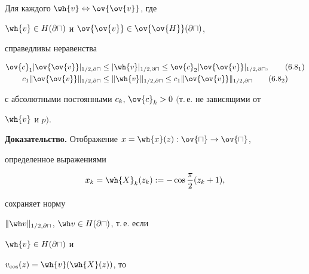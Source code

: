 \begin{lems}\label{lem6.1}


Для каждого $\wh{v}\Leftrightarrow \ov{\ov{v}}$, где 


$\wh{v}\in H(\partial\sqcap)$ и $\ov{\ov{v}}\in 


\ov{\ov{H}}(\partial\sqcap)$, 


справедливы неравенства 


\begin{gather}




\ov{c}_1|\ov{\ov{v}}|_{1/2,\partial\sqcap} \leq


|\wh{v}|_{1/2,\partial\sqcap} \leq


\ov{c}_2|\ov{\ov{v}}|_{1/2,\partial\sqcap},\tag{6.8$_1$} \\


%


c_1\|\ov{\ov{v}}\|_{1/2,\partial\sqcap} \leq


\|\wh{v}\|_{1/2,\partial\sqcap} \leq


c_1\|\ov{\ov{v}}\|_{1/2,\partial\sqcap}\tag{6.8$_2$}


\end{gather}


с абсолютными постоянными $c_k,\,\ov{c}_k > 0$ $($т.\,е. не зависящими от




$\wh{v}$ и $p)$.


\end{lems}


\addtocounter{equation}{1}





{\bf Доказательство.} Отображение $x=\wh{x}(z):\ov{\sqcap}\to\ov{\sqcap}$,


определенное выражениями


\begin{equation}\label{eq6.9}


x_k=\wh{X}_k(z_k):= -\cos\frac{\pi}{2}(z_k + 1),


\end{equation}


сохраняет норму 


$\|\wh v\|_{1/2,\partial\sqcap}$, $\wh v\in H(\partial\sqcap)$, т.\,е. если 


$\wh{v}\in H(\partial\sqcap)$ и


$v_{\cos} (z) = \wh{v}(\wh{X}(z))$, то


